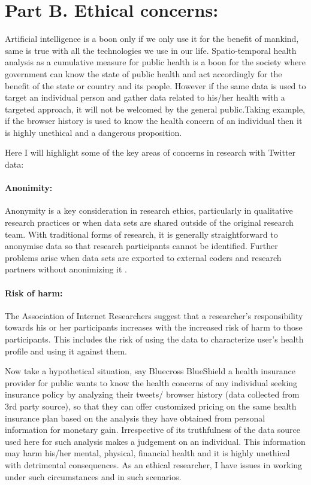 \section{Part B. Ethical concerns:}
\label{part_b}
Artificial intelligence is a boon only if we only use it for the benefit of mankind, same is true with all the technologies we use in our life. Spatio-temporal health analysis as a cumulative measure for public health is a boon for the society where government can know the state of public health and act accordingly for the benefit of the state or country and its people. However if the same data is used to target an individual person and gather data related to his/her health with a targeted approach, it will not be welcomed by the general public.Taking example, if the browser history is used to know the health concern of an individual then it is highly unethical and a dangerous proposition.

Here I will highlight some of the key areas of concerns in research with Twitter data:

\vspace{-2mm}
\paragraph{Anonimity:}
Anonymity	 is	 a	 key	 consideration	 in	 research	 ethics,	 particularly	 in	qualitative	 research practices or	when	data	sets	are	shared	outside	of	the	original	research	team. With	traditional	forms	of	research, it	is	generally
straightforward to	anonymise	data	so	that	research	participants	cannot	be	identified.
Further	 problems	 arise	 when	 data	 sets	 are
exported	 to	 external	 coders	 and	 research
partners without anonimizing it \cite{townsend2016social}.

\vspace{-2mm}
\paragraph{Risk of harm:}
The	Association	of	Internet	Researchers	suggest	that
a	researcher's	responsibility	towards	his	or	her	participants	increases	with	the	increased	risk of	 harm	 to	 those	 participants. This includes the risk of using the data to characterize user's health profile and using it against them.


Now take a hypothetical situation, say Bluecross BlueShield a health insurance provider for public wants to know the health concerns of any individual seeking insurance policy by analyzing their tweets/ browser history (data collected from 3rd party source), so that they can offer customized pricing on the same health insurance plan based on the analysis they have obtained from personal information for monetary gain. Irrespective of its truthfulness of the data source used here for such analysis  makes a judgement on an individual.
This information may harm his/her mental, physical, financial health and it is highly unethical with detrimental consequences.
As an ethical researcher, I have issues in working under such circumstances and in such scenarios.

